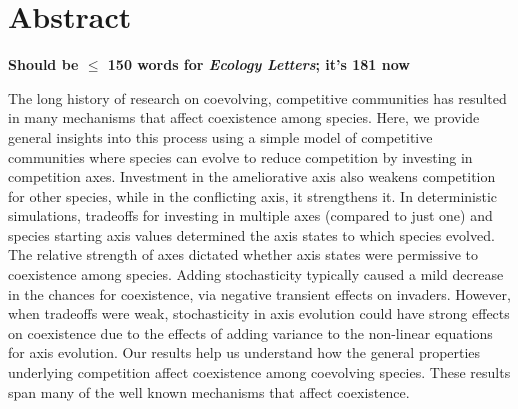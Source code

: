 \section*{Abstract}


\textbf{Should be $\le$ 150 words for \emph{Ecology Letters}; it's 181 now}


The long history of research on coevolving, competitive communities has resulted in 
many mechanisms that affect coexistence among species.
Here, we provide general insights into this process
using a simple model of competitive communities where species can evolve to reduce 
competition by investing in competition axes.
Investment in the ameliorative axis also weakens competition for other species, 
while in the conflicting axis, it strengthens it.
In deterministic simulations, 
tradeoffs for investing in multiple axes (compared to just one) and 
species starting axis values determined the axis states to which species evolved.
The relative strength of axes dictated whether axis states were permissive
to coexistence among species.
Adding stochasticity typically caused a mild decrease in the chances for
coexistence, via negative transient effects on invaders.
However, when tradeoffs were weak,
stochasticity in axis evolution could have strong effects on
coexistence due to the effects of adding variance to the non-linear
equations for axis evolution.
Our results help us understand how the general properties underlying
competition affect coexistence among coevolving species.
These results span many of the well known mechanisms that affect coexistence.




